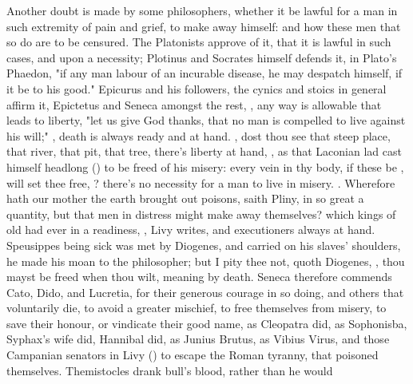 Another doubt is made by some philosophers, whether it be lawful for a man in
such extremity of pain and grief, to make away himself: and how these men that
so do are to be censured. The Platonists approve of it, that it is lawful in
such cases, and upon a necessity; Plotinus  and Socrates himself defends it, in Plato's Phaedon, "if any man labour
of an incurable disease, he may despatch himself, if it be to his good."
Epicurus and his followers, the cynics and stoics in general affirm it,
Epictetus and Seneca amongst the rest, , any way is allowable that leads to liberty,
"let us give God thanks, that no man is compelled to live
against his will;" , death is always ready and at hand. , dost thou see that steep place, that
river, that pit, that tree, there's liberty at hand, , as that Laconian lad cast himself headlong () to be freed of his misery: every vein in thy body, if these be
, will set thee free, ? there's no necessity for a man to live in misery. .
 Wherefore hath our mother the earth
brought out poisons, saith Pliny, in so great a quantity,
but that men in distress might make away themselves? which kings of old had
ever in a readiness, ,
Livy writes, and executioners always at hand. Speusippes being sick was met by
Diogenes, and carried on his slaves' shoulders, he made his moan to the
philosopher; but I pity thee not, quoth Diogenes, , thou mayst be freed when thou wilt, meaning by death.
Seneca therefore commends Cato, Dido, and Lucretia, for
their generous courage in so doing, and others that voluntarily die, to avoid a
greater mischief, to free themselves from misery, to save their honour, or
vindicate their good name, as Cleopatra did, as Sophonisba, Syphax's wife did,
Hannibal did, as Junius Brutus, as Vibius Virus, and those Campanian senators
in Livy () to escape the Roman tyranny,
that poisoned themselves. Themistocles drank bull's blood, rather than he would
